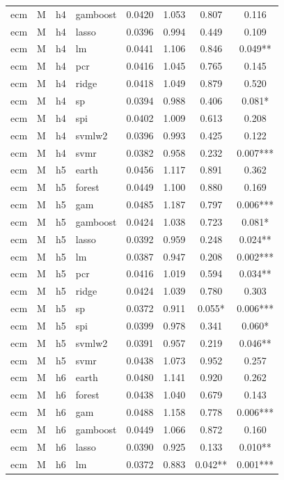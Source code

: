 \begin{ThreePartTable}
\begin{longtable}[t]{llclcccc}
ecm & M & h4 & gamboost & 0.0420 & 1.053 & 0.807 & 0.116\\
ecm & M & h4 & lasso & 0.0396 & 0.994 & 0.449 & 0.109\\
ecm & M & h4 & lm & 0.0441 & 1.106 & 0.846 & 0.049**\\
ecm & M & h4 & pcr & 0.0416 & 1.045 & 0.765 & 0.145\\
ecm & M & h4 & ridge & 0.0418 & 1.049 & 0.879 & 0.520\\
ecm & M & h4 & sp & 0.0394 & 0.988 & 0.406 & 0.081*\\
ecm & M & h4 & spi & 0.0402 & 1.009 & 0.613 & 0.208\\
ecm & M & h4 & svmlw2 & 0.0396 & 0.993 & 0.425 & 0.122\\
ecm & M & h4 & svmr & 0.0382 & 0.958 & 0.232 & 0.007***\\
\addlinespace
ecm & M & h5 & earth & 0.0456 & 1.117 & 0.891 & 0.362\\
ecm & M & h5 & forest & 0.0449 & 1.100 & 0.880 & 0.169\\
ecm & M & h5 & gam & 0.0485 & 1.187 & 0.797 & 0.006***\\
ecm & M & h5 & gamboost & 0.0424 & 1.038 & 0.723 & 0.081*\\
ecm & M & h5 & lasso & 0.0392 & 0.959 & 0.248 & 0.024**\\
ecm & M & h5 & lm & 0.0387 & 0.947 & 0.208 & 0.002***\\
ecm & M & h5 & pcr & 0.0416 & 1.019 & 0.594 & 0.034**\\
ecm & M & h5 & ridge & 0.0424 & 1.039 & 0.780 & 0.303\\
ecm & M & h5 & sp & 0.0372 & 0.911 & 0.055* & 0.006***\\
ecm & M & h5 & spi & 0.0399 & 0.978 & 0.341 & 0.060*\\
ecm & M & h5 & svmlw2 & 0.0391 & 0.957 & 0.219 & 0.046**\\
ecm & M & h5 & svmr & 0.0438 & 1.073 & 0.952 & 0.257\\
\addlinespace
ecm & M & h6 & earth & 0.0480 & 1.141 & 0.920 & 0.262\\
ecm & M & h6 & forest & 0.0438 & 1.040 & 0.679 & 0.143\\
ecm & M & h6 & gam & 0.0488 & 1.158 & 0.778 & 0.006***\\
ecm & M & h6 & gamboost & 0.0449 & 1.066 & 0.872 & 0.160\\
ecm & M & h6 & lasso & 0.0390 & 0.925 & 0.133 & 0.010**\\
ecm & M & h6 & lm & 0.0372 & 0.883 & 0.042** & 0.001***\\

\end{longtable}
\end{ThreePartTable}
